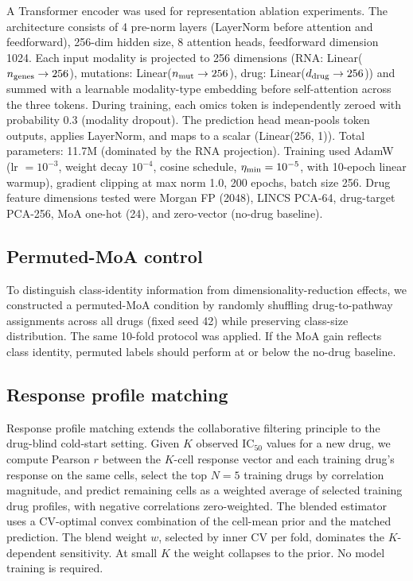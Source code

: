 A Transformer encoder\cite{vaswani2017attention} was used for representation ablation experiments. The architecture consists of 4 pre-norm layers (LayerNorm before attention and feedforward), 256-dim hidden size, 8 attention heads, feedforward dimension 1024. Each input modality is projected to 256 dimensions (RNA: Linear($n_{\rm genes} \to 256$), mutations: Linear($n_{\rm mut} \to 256$), drug: Linear($d_{\rm drug} \to 256$)) and summed with a learnable modality-type embedding before self-attention across the three tokens. During training, each omics token is independently zeroed with probability 0.3 (modality dropout). The prediction head mean-pools token outputs, applies LayerNorm, and maps to a scalar (Linear(256, 1)). Total parameters: 11.7M (dominated by the RNA projection). Training used AdamW (lr $= 10^{-3}$, weight decay $10^{-4}$, cosine schedule, $\eta_{\rm min} = 10^{-5}$, with 10-epoch linear warmup), gradient clipping at max norm 1.0, 200 epochs, batch size 256. Drug feature dimensions tested were Morgan FP (2048), LINCS PCA-64, drug-target PCA-256, MoA one-hot (24), and zero-vector (no-drug baseline).

\subsection*{Permuted-MoA control}

To distinguish class-identity information from dimensionality-reduction effects, we constructed a permuted-MoA condition by randomly shuffling drug-to-pathway assignments across all drugs (fixed seed 42) while preserving class-size distribution. The same 10-fold protocol was applied. If the MoA gain reflects class identity, permuted labels should perform at or below the no-drug baseline.

\subsection*{Response profile matching}

Response profile matching extends the collaborative filtering principle\cite{suphavilai2018predicting,zhang2018hybrid} to the drug-blind cold-start setting. Given $K$ observed IC$_{50}$ values for a new drug, we compute Pearson $r$ between the $K$-cell response vector and each training drug's response on the same cells, select the top $N = 5$ training drugs by correlation magnitude, and predict remaining cells as a weighted average of selected training drug profiles, with negative correlations zero-weighted. The blended estimator uses a CV-optimal convex combination of the cell-mean prior and the matched prediction. The blend weight $w$, selected by inner CV per fold, dominates the $K$-dependent sensitivity. At small $K$ the weight collapses to the prior. No model training is required.

